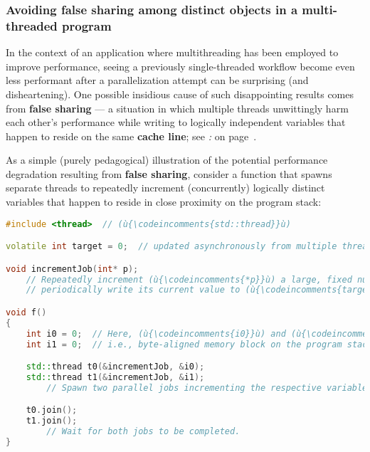 \subsubsection[Avoiding \textbf{false sharing} among distinct objects in a multi-threaded program]{Avoiding \textbf{false sharing} among distinct objects in a multi-threaded program}\label{avoiding-false-sharing-among-distinct-objects-in-a-multi-threaded-program}

In the context of an application where multithreading has been employed
to improve performance, seeing 
a previously single-threaded workflow become even less performant after
a parallelization attempt can be surprising (and disheartening). One possible insidious cause of such
disappointing results comes from \textbf{false sharing} --- a situation
in which multiple threads unwittingly harm each other's performance
while writing to logically independent variables that happen to reside
on the same \textbf{cache line}; see {\it {}:} {\it{}} on page~\pageref{cache-lines,-l1,-l2,-and-l3-cache,-pages,-and-virtual-memory}.

As a simple (purely pedagogical) illustration of the potential
performance degradation resulting from \textbf{false sharing}, consider
a function that spawns separate threads to repeatedly increment
(concurrently) logically distinct variables that happen to reside in
close proximity on the program stack:

\begin{lstlisting}[language=C++]
#include <thread>  // (ù{\codeincomments{std::thread}}ù)

volatile int target = 0;  // updated asynchronously from multiple threads

void incrementJob(int* p);
    // Repeatedly increment (ù{\codeincomments{*p}}ù) a large, fixed number of times;
    // periodically write its current value to (ù{\codeincomments{target}}ù).

void f()
{
    int i0 = 0;  // Here, (ù{\codeincomments{i0}}ù) and (ù{\codeincomments{i1}}ù) likely share the same cache line,
    int i1 = 0;  // i.e., byte-aligned memory block on the program stack.

    std::thread t0(&incrementJob, &i0);
    std::thread t1(&incrementJob, &i1);
        // Spawn two parallel jobs incrementing the respective variables.

    t0.join();
    t1.join();
        // Wait for both jobs to be completed.
}
\end{lstlisting}
    
